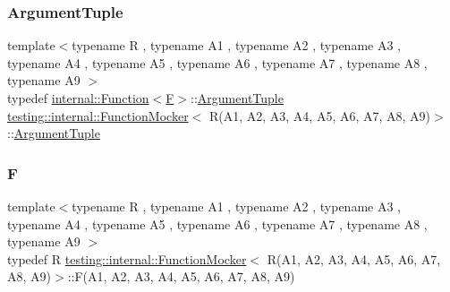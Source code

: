 \subsubsection{\texorpdfstring{ArgumentTuple}{ArgumentTuple}}
{\footnotesize\ttfamily template$<$typename R , typename A1 , typename A2 , typename A3 , typename A4 , typename A5 , typename A6 , typename A7 , typename A8 , typename A9 $>$ \\
typedef \mbox{\hyperlink{structtesting_1_1internal_1_1_function}{internal\+::\+Function}}$<$\mbox{\hyperlink{classtesting_1_1internal_1_1_function_mocker_3_01_r_07_a1_00_01_a2_00_01_a3_00_01_a4_00_01_a5_00d00d8722bf1ad86ca8049508f133d393_a8de64ec5559bd4e4410a4374e9c93e4e}{F}}$>$\+::\mbox{\hyperlink{classtesting_1_1internal_1_1_function_mocker_3_01_r_07_a1_00_01_a2_00_01_a3_00_01_a4_00_01_a5_00d00d8722bf1ad86ca8049508f133d393_afcb802dfc6e26a318bd0599846bff218}{Argument\+Tuple}} \mbox{\hyperlink{classtesting_1_1internal_1_1_function_mocker}{testing\+::internal\+::\+Function\+Mocker}}$<$ R(A1, A2, A3, A4, A5, A6, A7, A8, A9)$>$\+::\mbox{\hyperlink{classtesting_1_1internal_1_1_function_mocker_3_01_r_07_a1_00_01_a2_00_01_a3_00_01_a4_00_01_a5_00d00d8722bf1ad86ca8049508f133d393_afcb802dfc6e26a318bd0599846bff218}{Argument\+Tuple}}}

\mbox{\label{classtesting_1_1internal_1_1_function_mocker_3_01_r_07_a1_00_01_a2_00_01_a3_00_01_a4_00_01_a5_00d00d8722bf1ad86ca8049508f133d393_a8de64ec5559bd4e4410a4374e9c93e4e}} 
\subsubsection{\texorpdfstring{F}{F}}
{\footnotesize\ttfamily template$<$typename R , typename A1 , typename A2 , typename A3 , typename A4 , typename A5 , typename A6 , typename A7 , typename A8 , typename A9 $>$ \\
typedef R \mbox{\hyperlink{classtesting_1_1internal_1_1_function_mocker}{testing\+::internal\+::\+Function\+Mocker}}$<$ R(A1, A2, A3, A4, A5, A6, A7, A8, A9)$>$\+::F(A1, A2, A3, A4, A5, A6, A7, A8, A9)}



